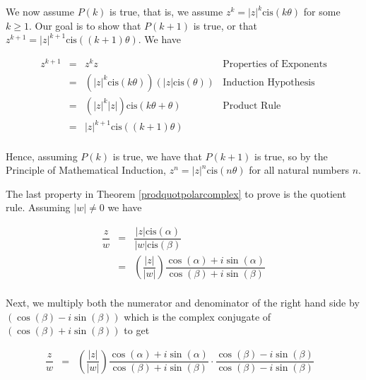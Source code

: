 \documentclass{ximera}
\begin{document}
\smallskip

We now assume $P(k)$ is true, that is, we assume  $z^{k} = |z|^{k} \text{cis}(k \theta)$ for some $k \geq 1$. Our goal is to show that $P(k+1)$ is true, or that $z^{k+1} = |z|^{k+1} \text{cis}((k+1)\theta)$. We have

\[ \begin{array}{rcll}

z^{k+1} & = & z^{k} z & \text{Properties of Exponents} \\[3pt]
				& = & \left(|z|^{k} \text{cis}(k \theta)\right) \left(|z| \text{cis}(\theta)\right) & \text{Induction Hypothesis}\\[3pt]
				& = & \left(|z|^k |z|\right) \text{cis}(k \theta + \theta) & \text{Product Rule}\\[3pt]
				& = & |z|^{k+1} \text{cis}((k+1)\theta) \\

\end{array} \] 

Hence, assuming $P(k)$ is true, we have that $P(k+1)$ is true, so by the Principle of Mathematical Induction, $z^{n} = |z|^{n} \text{cis}(n \theta)$ for all natural numbers $n$. 

\smallskip

The last property in Theorem \ref{prodquotpolarcomplex} to prove is the quotient rule.   Assuming $|w| \neq 0$ we have

\[ \begin{array}{rcl}

\dfrac{z}{w} & = & \dfrac{|z| \text{cis}(\alpha)}{|w| \text{cis}(\beta)}  \\ [8pt]
						 & = & \left( \dfrac{|z|}{|w|}\right) \dfrac{\cos(\alpha) + i \sin(\alpha)}{\cos(\beta) + i \sin(\beta)}   \\ 		 \end{array}\]
						 
Next, we multiply both the numerator and denominator of the right hand side by $(\cos(\beta) - i \sin(\beta))$ which is the complex conjugate of $(\cos(\beta) + i \sin(\beta))$ to get

\[\begin{array}{rcll}

\dfrac{z}{w}	& = & \left( \dfrac{|z|}{|w|}\right) \dfrac{\cos(\alpha) + i \sin(\alpha)}{\cos(\beta) + i \sin(\beta)} \cdot \dfrac{\cos(\beta) - i \sin(\beta)}{\cos(\beta) - i \sin(\beta)} & \\ \end{array}\]
\end{document}
